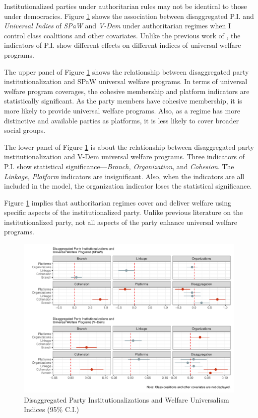 \documentclass[12pt]{article}
\begin{document}
	Institutionalized parties under authoritarian rules may not be identical to those under democracies. Figure \ref{fig:plot4} shows the association between disaggregated P.I. and \textit{Universal Indies} of \textit{SPaW} and \textit{V-Dem} under authoritarian regimes when I control class coalitions and other covariates. Unlike the previous work of \citet{Rasmussen2019}, the indicators of P.I. show different effects on different indices of universal welfare programs.
	
	The upper panel of Figure \ref{fig:plot4} shows the relationship between disaggregated party institutionalization and SPaW universal welfare programs. In terms of universal welfare program coverages, the cohesive membership and platform indicators are statistically significant. As the party members have cohesive membership, it is more likely to provide universal welfare programs. Also, as a regime has more distinctive and available parties as platforms, it is less likely to cover broader social groups.
	
	The lower panel of Figure \ref{fig:plot4} is about the relationship between disaggregated party institutionalization and V-Dem universal welfare programs. Three indicators of P.I. show statistical significance---\textit{Branch, Organization}, and \textit{Cohesion}. The \textit{Linkage, Platform} indicators are insignificant. Also, when the indicators are all included in the model, the organization indicator loses the statistical significance.
	
	Figure \ref{fig:plot4} implies that authoritarian regimes cover and deliver welfare using specific aspects of the institutionalized party. Unlike previous literature on the institutionalized party, not all aspects of the party enhance universal welfare programs.
	
	\begin{figure}[!htbt]
		\centering
		\includegraphics[width=0.9\linewidth]{"2_Figures/Appendix/Appendix7"}
		\caption{Disaggregated Party Institutionalizations and Welfare Universalism Indices (95\% C.I.)}
		\label{fig:plot4}
	\end{figure}
	
\end{document}
